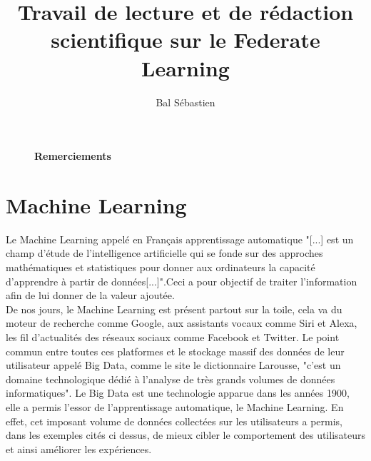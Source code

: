 \documentclass[12pt,a4paper]{report}
\begin{document}
\title{\Large{\Large {Travail de lecture et de rédaction scientifique sur le Federate Learning}}}

\author{Bal Sébastien}

\maketitle

\thispagestyle{empty} %





 


\begin{figure}[p]

\large\textbf{Remerciements}


\end{figure}

\tableofcontents
\thispagestyle{empty} %




\chapter{Machine Learning}
\fancyfoot[R]{\thepage}

\setcounter{page}{1} %


Le Machine Learning appelé en Français apprentissage automatique "[...] est un champ d'étude de l'intelligence artificielle qui se fonde sur des approches mathématiques et statistiques pour donner aux ordinateurs la capacité d'apprendre à partir de données[...]".Ceci a pour objectif de traiter l'information afin de lui donner de la valeur ajoutée.\\

De nos jours, le Machine Learning est présent partout sur la toile, cela va du moteur de recherche comme Google, aux assistants vocaux comme Siri et Alexa, les fil d'actualités des réseaux sociaux comme Facebook et Twitter. Le point commun entre toutes ces platformes et le stockage massif des données de leur utilisateur appelé Big Data, comme le site le dictionnaire Larousse, "c'est un domaine technologique dédié à l'analyse de très grands volumes de données informatiques". Le Big Data est une technologie apparue dans les années 1900, elle a permis l'essor de l'apprentissage automatique, le Machine Learning. En effet, cet imposant volume de données collectées sur les utilisateurs a permis, dans les exemples cités ci dessus, de mieux cibler le comportement des utilisateurs et ainsi améliorer les expériences.\\
\end{document}
